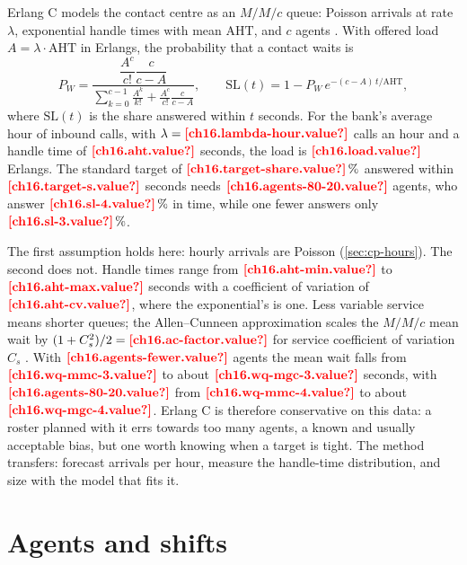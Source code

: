 Erlang C models the contact centre as an $M/M/c$ queue: Poisson arrivals at rate $\lambda$, exponential handle times with mean
$\mathrm{AHT}$, and $c$ agents \autocite{gross2008}. With offered load $A = \lambda \cdot \mathrm{AHT}$ in Erlangs, the probability
that a contact waits is
\begin{equation}\label{eq:op-erlangc}
  P_W = \frac{\dfrac{A^c}{c!} \dfrac{c}{c - A}}{\displaystyle \sum_{k=0}^{c-1} \frac{A^k}{k!} + \frac{A^c}{c!} \frac{c}{c - A}},
  \qquad
  \mathrm{SL}(t) = 1 - P_W\, e^{-(c - A)\, t / \mathrm{AHT}},
\end{equation}
where $\mathrm{SL}(t)$ is the share answered within $t$ seconds. For the bank's average hour of inbound calls, with
$\lambda = \est{ch16.lambda-hour}{value}$ calls an hour and a handle time of $\est{ch16.aht}{value}$ seconds, the load is
$\est{ch16.load}{value}$ Erlangs. The standard target of $\est{ch16.target-share}{value}\,\%$ answered within
$\est{ch16.target-s}{value}$ seconds needs $\est{ch16.agents-80-20}{value}$ agents, who answer $\est{ch16.sl-4}{value}\,\%$ in time,
while one fewer answers only $\est{ch16.sl-3}{value}\,\%$.

The first assumption holds here: hourly arrivals are Poisson (\cref{sec:cp-hours}). The second does not. Handle times range
from $\est{ch16.aht-min}{value}$ to $\est{ch16.aht-max}{value}$ seconds with a coefficient of variation of
$\est{ch16.aht-cv}{value}$, where the exponential's is one. Less variable service means shorter queues; the Allen--Cunneen
approximation scales the $M/M/c$ mean wait by $(1 + C_s^2)/2 = \est{ch16.ac-factor}{value}$ for service coefficient of
variation $C_s$ \autocite{allen1990}. With $\est{ch16.agents-fewer}{value}$ agents the mean wait falls from
$\est{ch16.wq-mmc-3}{value}$ to about $\est{ch16.wq-mgc-3}{value}$ seconds, with $\est{ch16.agents-80-20}{value}$ from
$\est{ch16.wq-mmc-4}{value}$ to about $\est{ch16.wq-mgc-4}{value}$. Erlang C is therefore conservative on this data: a roster
planned with it errs towards too many agents, a known and usually acceptable bias, but one worth knowing when a target is
tight. The method transfers: forecast arrivals per hour, measure the handle-time distribution, and size with the model that
fits it.

\section{Agents and shifts}\label{sec:op-agents}

